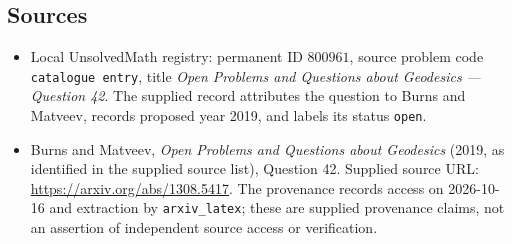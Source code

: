 \documentclass[11pt]{article}
\begin{document}
\subsection{Sources}
\begin{itemize}
\item Local UnsolvedMath registry: permanent ID \(800961\), source problem code \texttt{catalogue entry}, title \emph{Open Problems and Questions about Geodesics --- Question 42}. The supplied record attributes the question to Burns and Matveev, records proposed year 2019, and labels its status \texttt{open}.
\item Burns and Matveev, \emph{Open Problems and Questions about Geodesics} (2019, as identified in the supplied source list), Question 42. Supplied source URL: \url{https://arxiv.org/abs/1308.5417}. The provenance records access on 2026-10-16 and extraction by \texttt{arxiv\_latex}; these are supplied provenance claims, not an assertion of independent source access or verification.
\end{itemize}
\end{document}
